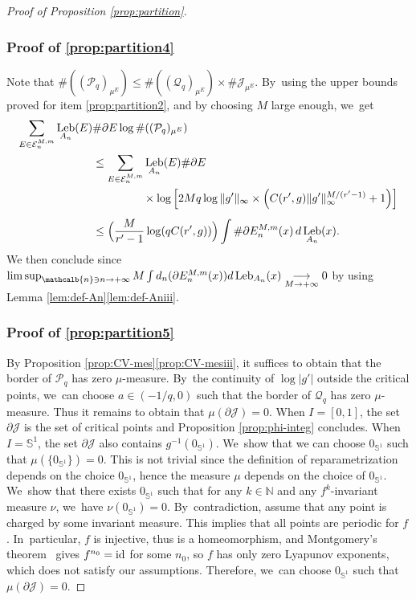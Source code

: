 \documentclass[JEP,XML,SOM,Unicode,NoFloatCountersInSection,published]{cedram}
\newcommand{\id}{\textup{id}}
\DeclareMathOperator{\Leb}{Leb}
\newcommand{\mcbn}{{\mathcalb{n}}}
\theoremstyle{definition}
\newcommand{\bbN}{{\mathbb{N}}}
\newcommand{\bbS}{{\mathbb{S}}}
\begin{document}
\begin{proof}[Proof of Proposition \ref{prop:partition}]
\subsubsection*{Proof of \eqref{prop:partition4}}
Note that $\# ((\mathcal{P}_q)_{\mu^E}) \leq \# ((\mathcal{Q}_q)_{\mu^E}) \times \# \mathcal{J}_{\mu^E}$. By~using the upper bounds proved for item \eqref{prop:partition2}, and by choosing $M$ large enough, we~get
\begin{align*}
\sum_{E \in \mathcal{E}_n^{M,m}} \Leb_{A_n}(E) &\# \partial E \log \# ((\mathcal{P}_q)_{\mu^E}) \\
&\leq \sum_{E \in \mathcal{E}_n^{M,m}} \Leb_{A_n}(E) \# \partial E\\
&\hspace{4.5em} {}\times\log \left [ 2M q \log \| g' \|_{\infty} \times \left (C(r',g) \| g' \|_{\infty}^{M / (r' - 1)} + 1 \right) \right ]\\[0.5em]
&\leq \Bigl (\frac{M}{r' - 1} \log (q C(r',g)) \Bigr) \int \# \partial E_n^{M,m}(x)\, d\Leb_{A_n}(x).
\end{align*}
We then conclude since $\limsup_{\mcbn \ni n \to +\infty} M \int d_n(\partial E_n^{M,m}(x)) d \Leb_{A_n}(x) \underset{M \to +\infty}{\longrightarrow} 0$ by using Lemma \ref{lem:def-An}\eqref{lem:def-Aniii}.

\subsubsection*{Proof of \eqref{prop:partition5}}
By Proposition \ref{prop:CV-mes}\eqref{prop:CV-mesiii}, it suffices to obtain that the border of $\mathcal{P}_q$ has zero $\mu$-measure. By~the continuity of $\log |g'|$ outside the critical points, we~can choose $a \in (- 1 /q, 0)$ such that the border of $\mathcal{Q}_q$ has zero $\mu$-measure.
Thus it remains to obtain that $\mu (\partial \mathcal{J}) = 0$.
When $I = [0,1]$, the set $\partial \mathcal{J}$ is the set of critical points and Proposition \ref{prop:phi-integ} concludes.
When $I = \bbS^1$, the set $\partial \mathcal{J}$ also contains $g^{-1}(0_{\bbS^1})$. We~show that we can choose $0_{\bbS^1}$ such that $\mu(\{ 0_{\bbS^1} \}) = 0$.
This is not trivial since the definition of reparametrization depends on the choice $0_{\bbS^1}$, hence the measure $\mu$ depends on the choice of $0_{\bbS^1}$. We~show that there exists $0_{\bbS^1}$ such that for any $k \in \bbN$ and any $f^k$-invariant measure $\nu$, we~have $\nu(0_{\bbS^1}) = 0$. By~contradiction, assume that any point is charged by some invariant measure.
This implies that all points are periodic for $f$. In~particular, $f$ is injective, thus is a homeomorphism, and Montgomery's theorem~\cite{Montgomery} gives $f^{n_0} = \id$ for some $n_0$, so $f$ has only zero Lyapunov exponents, which does not satisfy our assumptions.
Therefore, we~can choose $0_{\bbS^1}$ such that $\mu(\partial \mathcal{J}) = 0$.
\end{proof}
\end{document}
